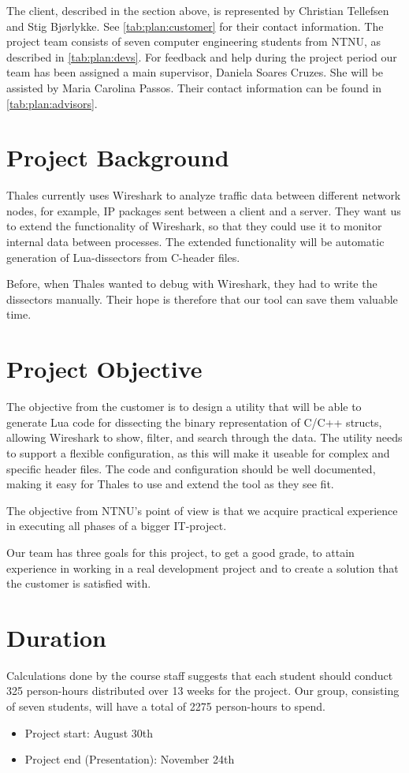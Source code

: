 The client, described in the section above, is represented by Christian Tellefsen and Stig Bjørlykke. See \autoref{tab:plan:customer} for their contact information.
The project team consists of seven computer engineering students from NTNU, as described in \autoref{tab:plan:devs}.
For feedback and help during the project period our team has been assigned a main supervisor, Daniela Soares Cruzes.
She will be assisted by Maria Carolina Passos. Their contact information can be found in \autoref{tab:plan:advisors}.

\section{Project Background}
Thales currently uses Wireshark to analyze traffic data between different network nodes, for example, IP packages sent between a client and a server.
They want us to extend the functionality of Wireshark, so that they could use it to monitor internal data between processes. The extended functionality will be automatic generation of Lua-dissectors from C-header files.

Before, when Thales wanted to debug with Wireshark, they had to write the dissectors manually. Their hope is therefore that our tool can save them valuable time.

\section{Project Objective}
The objective from the customer is to design a utility that will be able to generate Lua code for dissecting the binary representation of C/C++ structs, allowing Wireshark to show, filter, and search through the data. The utility needs to support a flexible configuration, as this will make it useable for complex and specific header files. 
The code and configuration should be well documented, making it easy for Thales to use and extend the tool as they see fit.

The objective from NTNU's point of view is that we acquire practical experience in executing all phases of a bigger IT-project.

Our team has three goals for this project, to get a good grade, to attain experience in working in a real development project and to create a solution that the customer
is satisfied with.

\section{Duration}
Calculations done by the course staff suggests that each student should conduct 325 person-hours distributed over 13 weeks for the project. Our group, consisting of seven students, will have a total of 2275 person-hours to spend.\\
\begin {itemize}
	\item Project start: August 30th
	\item Project end (Presentation): November 24th
\end{itemize}

